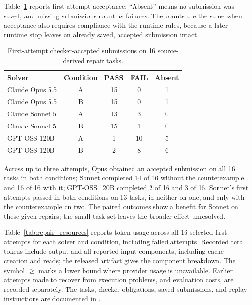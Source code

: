 Table~\ref{tab:repair_outcomes} reports first-attempt acceptance; ``Absent'' means no submission was saved, and missing submissions count as failures. The counts are the same when acceptance also requires compliance with the runtime rules, because a later runtime stop leaves an already saved, accepted submission intact.

\begin{table}[h]
\centering
\caption{First-attempt checker-accepted submissions on 16 source-derived repair tasks.}
\label{tab:repair_outcomes}
\begin{tabular}{l c c c c}
\toprule
\textbf{Solver} & \textbf{Condition} & \textbf{PASS} & \textbf{FAIL} & \textbf{Absent} \\
\midrule
Claude Opus 5.5 & A & 15 & 0 & 1 \\
Claude Opus 5.5 & B & 15 & 0 & 1 \\
Claude Sonnet 5 & A & 13 & 3 & 0 \\
Claude Sonnet 5 & B & 15 & 1 & 0 \\
GPT-OSS 120B    & A & 1 & 10 & 5 \\
GPT-OSS 120B    & B & 2 & 8 & 6 \\
\bottomrule
\end{tabular}
\end{table}

Across up to three attempts, Opus obtained an accepted submission on all 16 tasks in both conditions; Sonnet completed 14 of 16 without the counterexample and 16 of 16 with it; GPT-OSS 120B completed 2 of 16 and 3 of 16. Sonnet's first attempts passed in both conditions on 13 tasks, in neither on one, and only with the counterexample on two. The paired outcomes show a benefit for Sonnet on these given repairs; the small task set leaves the broader effect unresolved.

Table~\ref{tab:repair_resources} reports token usage across all 16 selected first attempts for each solver and condition, including failed attempts. Recorded total tokens include output and all reported input components, including cache creation and reads; the released artifact gives the component breakdown. The symbol $\ge$ marks a lower bound where provider usage is unavailable. Earlier attempts made to recover from execution problems, and evaluation costs, are recorded separately. The tasks, checker obligations, saved submissions, and replay instructions are documented in .

